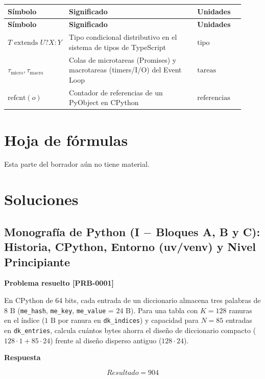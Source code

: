 \documentclass{book}
\begin{document}
\begingroup
\setlength{\LTpre}{0pt}
\setlength{\LTpost}{0pt}
\begin{longtable}{@{}>{\centering\arraybackslash}p{0.17\linewidth}>{\raggedright\arraybackslash}p{0.55\linewidth}>{\raggedright\arraybackslash}p{0.2\linewidth}@{}}
\textbf{Símbolo} & \textbf{Significado} & \textbf{Unidades} \\
\hline
\endfirsthead
\textbf{Símbolo} & \textbf{Significado} & \textbf{Unidades} \\
\hline
\endhead
$T \text{ extends } U ? X : Y$ & Tipo condicional distributivo en el sistema de tipos de TypeScript & $\mathrm{tipo}$ \\
$\tau_{\text{micro}}, \tau_{\text{macro}}$ & Colas de microtareas (Promises) y macrotareas (timers/I/O) del Event Loop & $\mathrm{tareas}$ \\
$\text{refcnt}(o)$ & Contador de referencias de un PyObject en CPython & $\mathrm{referencias}$ \\
\end{longtable}
\endgroup
\chapter{Hoja de fórmulas}

\noindent Esta parte del borrador aún no tiene material.
\chapter{Soluciones}

\section{Monografía de Python (I \(-\) Bloques A, B y C): Historia, CPython, Entorno (uv/venv) y Nivel Principiante}

\noindent\textbf{Problema resuelto [PRB-0001]}

En CPython de 64 bits, cada entrada de un diccionario almacena tres palabras de \(8\text{ B}\) (\texttt{me\_hash}, \texttt{me\_key}, \texttt{me\_value} = \(24\text{ B}\)). Para una tabla con \(K = 128\) ranuras en el índice (\(1\text{ B}\) por ranura en \texttt{dk\_indices}) y capacidad para \(N = 85\) entradas en \texttt{dk\_entries}, calcula cuántos bytes ahorra el diseño de diccionario compacto (\(128 \cdot 1 + 85 \cdot 24\)) frente al diseño disperso antiguo (\(128 \cdot 24\)).

\noindent\textbf{Respuesta}

\[
Resultado = 904
\]
\end{document}
